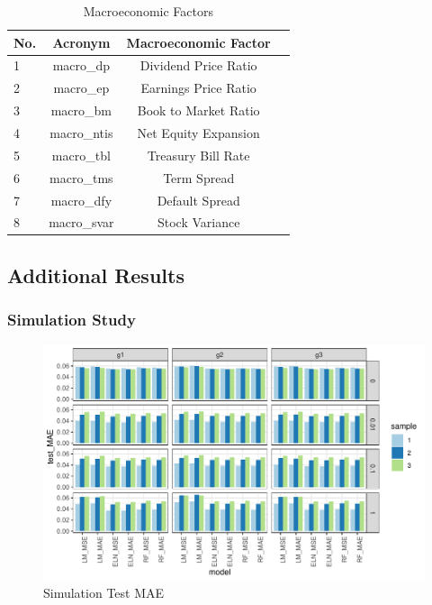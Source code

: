 \documentclass[a4paper, table]{article}
\begin{document}
\newpage


\begin{table}
	\caption{Macroeconomic Factors}
	\begin{center}
	\begin{tabular}{lccc} \hline
		No. & Acronym & Macroeconomic Factor \\ \hline
		1 & macro\_dp & Dividend Price Ratio \\
		2 & macro\_ep & Earnings Price Ratio \\
		3 & macro\_bm & Book to Market Ratio \\
		4 & macro\_ntis & Net Equity Expansion \\
		5 & macro\_tbl & Treasury Bill Rate \\
		6 & macro\_tms & Term Spread \\
		7 & macro\_dfy & Default Spread \\
		8 & macro\_svar & Stock Variance \\ \hline
	\end{tabular}
	\end{center}
\end{table}

\newpage

\subsection{Additional Results}

\subsubsection{Simulation Study}

\begin{figure}
	\includegraphics{simulation_test_mae.pdf}
	\caption{Simulation Test MAE}
\end{figure}
\end{document}
